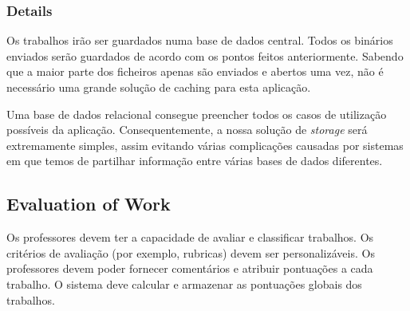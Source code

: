 \documentclass[10pt]{article}
\begin{document}
\subsubsection{Details}
Os trabalhos irão ser guardados numa  base de dados central. Todos os binários enviados serão guardados
de acordo com os pontos feitos anteriormente. Sabendo que a maior parte dos ficheiros apenas são enviados
e abertos uma vez, não é necessário uma grande solução de caching para esta aplicação.

Uma base de dados relacional consegue preencher todos os casos de utilização possíveis da aplicação.
Consequentemente, a nossa solução de \textit{storage} será extremamente simples, assim evitando várias
complicações causadas por sistemas em que temos de partilhar informação entre várias bases de dados diferentes.

\newpage

\subsection{Evaluation of Work}
Os professores devem ter a capacidade de avaliar e classificar trabalhos. 
Os critérios de avaliação (por exemplo, rubricas) devem ser personalizáveis. 
Os professores devem poder fornecer comentários e atribuir pontuações a cada trabalho. 
O sistema deve calcular e armazenar as pontuações globais dos trabalhos.
\end{document}
